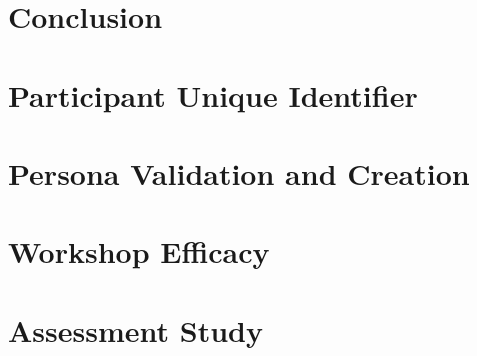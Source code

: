 \documentclass[doublespace,final,nopageskip]{VTthesis} %
\begin{document}
    \chapter{Conclusion}
        \label{ch:conclusion}
        


    
    


    \appendix

    \begin{appendices}
        \chapter{Participant Unique Identifier} \label{app:participant-id}
            
        \chapter{Persona Validation and Creation} \label{app:persona_validation_creation}
            
        \chapter{Workshop Efficacy} \label{app:workshop_efficacy}
            
        \chapter{Assessment Study} \label{app:exercises}
            
    \end{appendices}
\end{document}
